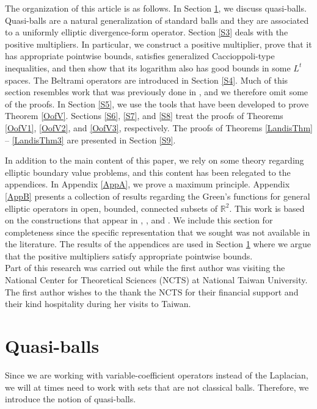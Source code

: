 \documentclass[12pt,reqno]{amsart}
\theoremstyle{plain}
\theoremstyle{definition}
\newcommand{\nid}{\noindent}
\newcommand{\R}{\ensuremath{\mathbb{R}}}
\begin{document}
The organization of this article is as follows.
In Section \ref{S2}, we discuss quasi-balls.
Quasi-balls are a natural generalization of standard balls and they are associated to a uniformly elliptic divergence-form operator.
Section \ref{S3} deals with the positive multipliers.
In particular, we construct a positive multiplier, prove that it has appropriate pointwise bounds, satisfies generalized Caccioppoli-type inequalities, and then show that its logarithm also has good bounds in some $L^t$ spaces.
The Beltrami operators are introduced in Section \ref{S4}.
Much of this section resembles work that was previously done in \cite{DKW17}, and we therefore omit some of the proofs.
In Section \ref{S5}, we use the tools that have been developed to prove Theorem \ref{OofV}.
Sections \ref{S6}, \ref{S7}, and \ref{S8} treat the proofs of Theorems \ref{OofV1}, \ref{OofV2}, and \ref{OofV3}, respectively.
The proofs of Theorems \ref{LandisThm} -- \ref{LandisThm3} are presented in Section \ref{S9}.

In addition to the main content of this paper, we rely on some theory regarding elliptic boundary value problems, and this content has been relegated to the appendices.
In Appendix \ref{AppA}, we prove a maximum principle.
Appendix \ref{AppB} presents a collection of results regarding the Green's functions for general elliptic operators in open, bounded, connected subsets of $\R^2$.
This work is based on the constructions that appear in \cite{GW82}, \cite{HK07}, and \cite{DHM16}.
We include this section for completeness since the specific representation that we sought was not available in the literature.
The results of the appendices are used in Section \ref{S2} where we argue that the positive multipliers satisfy appropriate pointwise bounds. \\

\nid {\bf Acknowledgement.}
Part of this research was carried out while the first author was visiting the National Center for Theoretical Sciences (NCTS) at National Taiwan University.
The first author wishes to the thank the NCTS for their financial support and their kind hospitality during her visits to Taiwan.

\section{Quasi-balls}
\label{S2}

Since we are working with variable-coefficient operators instead of the Laplacian, we will at times need to work with sets that are not classical balls.
Therefore, we introduce the notion of quasi-balls.
\end{document}
